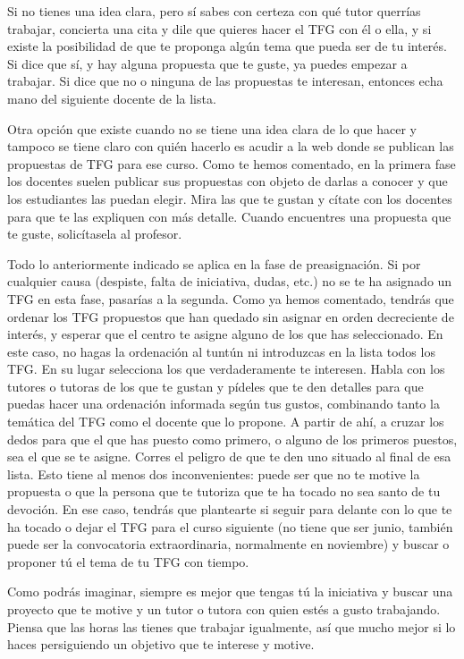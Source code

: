Si no tienes una idea clara, pero sí sabes con certeza con qué tutor querrías trabajar, concierta una cita y dile que quieres hacer el TFG con él o ella, y si existe la posibilidad de que te proponga algún tema que pueda ser de tu interés. Si dice que sí, y hay alguna propuesta que te guste, ya puedes empezar a trabajar. Si dice que no o ninguna de las propuestas te interesan, entonces echa mano del siguiente docente de la lista.

Otra opción que existe cuando no se tiene una idea clara de lo que hacer y tampoco se tiene claro con quién hacerlo es acudir a la web donde se publican las propuestas de TFG para ese curso. Como te hemos comentado, en la primera fase los docentes suelen publicar sus propuestas con objeto de darlas a conocer y que los estudiantes las puedan elegir. Mira las que te gustan y cítate con los docentes para que te las expliquen con más detalle. Cuando encuentres una propuesta que te guste, solicítasela al profesor. 

Todo lo anteriormente indicado se aplica en la fase de preasignación. Si por cualquier causa (despiste, falta de iniciativa, dudas, etc.) no se te ha asignado un TFG en esta fase, pasarías a la segunda. Como ya hemos comentado, tendrás que ordenar los TFG propuestos que han quedado sin asignar en orden decreciente de interés, y esperar que el centro te asigne alguno de los que has seleccionado. En este caso, no hagas la ordenación al tuntún ni introduzcas en la lista todos los TFG. En su lugar selecciona los que verdaderamente te interesen. Habla con los tutores o tutoras de los que te gustan y pídeles que te den detalles para que puedas hacer una ordenación informada según tus gustos, combinando tanto la temática del TFG como el docente que lo propone. A partir de ahí, a cruzar los dedos para que el que has puesto como primero, o alguno de los primeros puestos, sea el que se te asigne. Corres el peligro de que te den uno situado al final de esa lista. Esto tiene al menos dos inconvenientes: puede ser que no te motive la propuesta o que la persona que te tutoriza que te ha tocado no sea santo de tu devoción. En ese caso, tendrás que plantearte si seguir para delante con lo que te ha tocado o dejar el TFG para el curso siguiente (no tiene que ser junio, también puede ser la convocatoria extraordinaria, normalmente en noviembre) y buscar o proponer tú el tema de tu TFG con tiempo.

Como podrás imaginar, siempre es mejor que tengas tú la iniciativa y buscar una proyecto que te motive y un tutor o tutora con quien estés a gusto trabajando. Piensa que las horas las tienes que trabajar igualmente, así que mucho mejor si lo haces persiguiendo un objetivo que te interese y motive.

